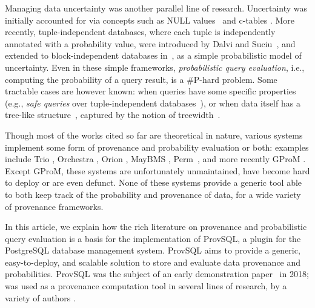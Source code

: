 Managing data uncertainty was another parallel line of research.
Uncertainty was initially accounted for via concepts such as NULL values~\cite{dblp:journals/sigmod/codd75b} and c-tables \cite{imielinskil84}.
More recently, tuple-independent databases, where each tuple is
independently annotated with a probability value, were introduced
by Dalvi and Suciu~\cite{dblp:conf/vldb/dalvis04}, and extended to block-independent
databases in~\cite{dblp:journals/jcss/dalvirs11}, as a simple probabilistic
model of uncertainty. Even in these simple frameworks,
\emph{probabilistic query evaluation}, i.e., computing the probability of
a query result, is a \textsf{\#P}-hard problem.
Some tractable cases are however known: when queries have some
specific properties (e.g., \emph{safe queries} over tuple-independent databases~\cite{dalvi2013dichotomy}), or when data
itself has a tree-like structure~\cite{amarilli2015provenance}, captured
by the notion of treewidth~\cite{maniu2019experimental}.

Though most of the works cited so far are theoretical in nature, various
systems implement some form of provenance and
probability evaluation or both: examples include Trio
\cite{dblp:conf/vldb/agrawalbshnsw06}, Orchestra
\cite{DBLP:conf/sigmod/GreenKTBIT07},
Orion \cite{singh2008orion}, MayBMS
\cite{huang2009maybms},
Perm~\cite{DBLP:conf/icde/GlavicA09},
and more recently GProM \cite{bahareh2018gprom}. Except
GProM, these systems are unfortunately unmaintained, have become hard to
deploy or are even defunct.
None of these systems provide a generic tool able to both keep track of
the probability and provenance of data, for a wide variety of provenance frameworks.

In this article, we explain how the rich
literature on provenance and probabilistic query evaluation is a basis
for the implementation of ProvSQL, a plugin for the PostgreSQL database
management system. ProvSQL aims to provide a generic, easy-to-deploy, and
scalable solution to store and evaluate data provenance and
probabilities.  ProvSQL was the subject
of an early demonstration paper~\cite{senellart2018provsql} in 2018;  was used as a
provenance computation tool in several lines of research, by a variety of authors
\cite{DBLP:conf/ijcai/CalvaneseLOP019,DBLP:conf/sigmod/DavidsonDFKKM22,DBLP:journals/corr/abs-2109-06339,DBLP:conf/ideas/PintorCM22,DBLP:conf/dlog/BorgwardtBK23,yunus2025using}.

